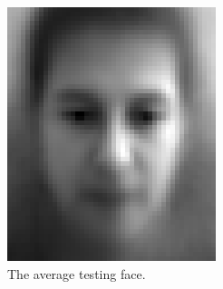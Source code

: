 \documentclass[a4paper, 10pt, conference]{ieeeconf}
\begin{document}
\begin{figure}[ht]
	\captionsetup[subfigure]{position=b}
        \centering
        \begin{subfigure}{0.2\textwidth}
                \includegraphics[width=\textwidth]{src/mean_face.png}
                \caption{The average testing face.}
                \label{fig:meanface}
        \end{subfigure}
        ~
        \begin{subfigure}{0.2\textwidth}

\end{subfigure}
\end{figure}
\end{document}
